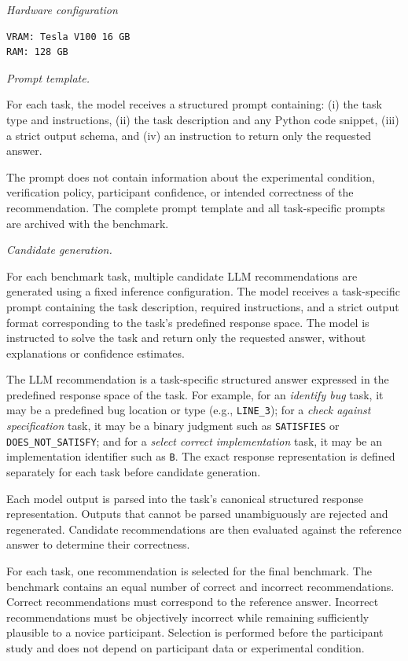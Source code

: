 \documentclass[oneside,final,14pt,a4paper]{extreport}
\begin{document}
\emph{Hardware configuration}
\begin{verbatim}
VRAM: Tesla V100 16 GB
RAM: 128 GB
\end{verbatim}

\emph{Prompt template.}

For each task, the model receives a structured prompt containing:
(i) the task type and instructions, (ii) the task description and any Python
code snippet, (iii) a strict output schema, and (iv) an instruction to return
only the requested answer.

The prompt does not contain information about the experimental condition,
verification policy, participant confidence, or intended correctness of the
recommendation. The complete prompt template and all task-specific prompts are
archived with the benchmark.

\emph{Candidate generation.}

For each benchmark task, multiple candidate LLM recommendations are 
generated using a fixed inference configuration. The model receives 
a task-specific prompt containing the task description, required instructions, 
and a strict output format corresponding to the task's predefined response 
space. The model is instructed to solve the task and return only the 
requested answer, without explanations or confidence estimates.

The LLM recommendation is a task-specific structured answer expressed 
in the predefined response space of the task. For example, 
for an \emph{identify bug} task, it 
may be a predefined bug location or type (e.g., \texttt{LINE\_3}); 
for a \emph{check against specification} task, it may be a binary judgment 
such as \texttt{SATISFIES} or \texttt{DOES\_NOT\_SATISFY}; and for a 
\emph{select correct implementation} task, it may be an implementation 
identifier such as \texttt{B}. The exact response representation is defined 
separately for each task before candidate generation.

Each model output is parsed into the task's canonical structured response 
representation. Outputs that cannot be parsed unambiguously are rejected 
and regenerated. Candidate recommendations are then evaluated against the 
reference answer to determine their correctness.

For each task, one recommendation is selected for the final benchmark. 
The benchmark contains an equal number of correct and incorrect recommendations. 
Correct recommendations must correspond to the reference answer. Incorrect 
recommendations must be objectively incorrect while remaining sufficiently 
plausible to a novice participant. Selection is performed before the participant 
study and does not depend on participant data or experimental condition.
\end{document}

